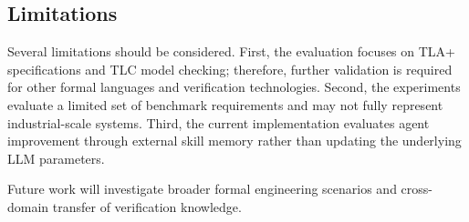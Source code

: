 \subsection{Limitations}

Several limitations should be considered. First, the evaluation focuses on
TLA+ specifications and TLC model checking; therefore, further validation is
required for other formal languages and verification technologies. Second,
the experiments evaluate a limited set of benchmark requirements and may not
fully represent industrial-scale systems. Third, the current implementation
evaluates agent improvement through external skill memory rather than updating
the underlying LLM parameters.

Future work will investigate broader formal engineering scenarios and
cross-domain transfer of verification knowledge.
